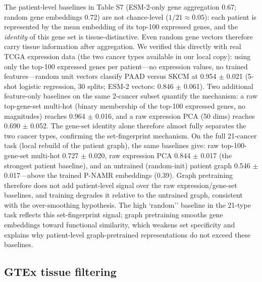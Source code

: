 \documentclass[11pt,a4paper]{article}
\begin{document}
The patient-level baselines in Table S7 (ESM-2-only gene aggregation 0.67; random gene embeddings 0.72) are not chance-level ($1/21 \approx 0.05$): each patient is represented by the mean embedding of its top-100 expressed genes, and the \textit{identity} of this gene set is tissue-distinctive. Even random gene vectors therefore carry tissue information after aggregation. We verified this directly with real TCGA expression data (the two cancer types available in our local copy): using only the top-100 expressed genes per patient---no expression values, no trained features---random unit vectors classify PAAD versus SKCM at 0.954 $\pm$ 0.021 (5-shot logistic regression, 30 splits; ESM-2 vectors: 0.846 $\pm$ 0.061). Two additional feature-only baselines on the same 2-cancer subset quantify the mechanism: a raw top-gene-set multi-hot (binary membership of the top-100 expressed genes, no magnitudes) reaches 0.964 $\pm$ 0.016, and a raw expression PCA (50 dims) reaches 0.690 $\pm$ 0.052. The gene-set identity alone therefore almost fully separates the two cancer types, confirming the set-fingerprint mechanism. On the full 21-cancer task (local rebuild of the patient graph), the same baselines give: raw top-100-gene-set multi-hot 0.727 $\pm$ 0.020, raw expression PCA 0.844 $\pm$ 0.017 (the strongest patient baseline), and an untrained (random-init) patient graph 0.546 $\pm$ 0.017---above the trained P-NAMR embeddings (0.39). Graph pretraining therefore does not add patient-level signal over the raw expression/gene-set baselines, and training degrades it relative to the untrained graph, consistent with the over-smoothing hypothesis. The high `random'' baseline in the 21-type task reflects this set-fingerprint signal; graph pretraining smooths gene embeddings toward functional similarity, which weakens set specificity and explains why patient-level graph-pretrained representations do not exceed these baselines.



\FloatBarrier


\subsection{GTEx tissue filtering}
\end{document}
